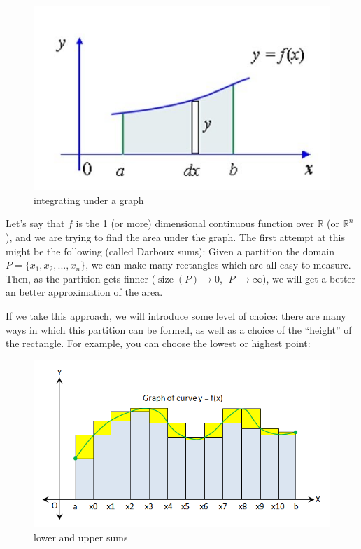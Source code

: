 \documentclass[oneside]{book}
\newcommand{\R}{\mathbb{R}}
\newcommand{\rw}{\rightarrow}
\begin{document}
\begin{figure}[H] 
  \centering
  \includegraphics{fig_graphExample}
  \caption{integrating under a graph}
  \label{fig:preliminaryGraph}
\end{figure}

Let's say that $f$ is the 1 (or more) dimensional continuous function over $\R$ (or $\R^n$), and we are trying to find
the area under the graph. The first attempt at this might be the following (called Darboux sums): Given a partition the
domain $P = \{ x_1, x_2, ..., x_n\}$, we can make many rectangles which are all easy to measure. Then, as the partition
gets finner ($\operatorname{size}(P) \rw 0$, $|P| \rw \infty$), we will get a better an better approximation of the area. 

If we take this approach, we will introduce some level of choice: there are many ways in which this partition can be formed,
as well as a choice of the ``height'' of the rectangle. For example, you can choose the lowest or highest point:

\begin{figure}[H] 
  \centering
  \includegraphics{fig_darbouxSumEx}
  \caption{lower and upper sums}
  \label{fig:darbouxSumEx}
\end{figure}
\end{document}
